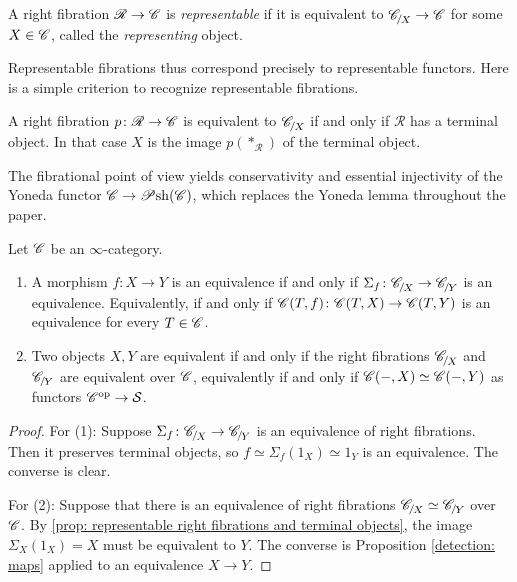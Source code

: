 \documentclass[twoside,a4paper,11pt]{amsart}
\begin{document}
\begin{definition}\label{def: representable fibration}
    A right fibration $\mathscr{R}\to\mathscr{C}$ is \textit{representable} if it is equivalent to $\slice{\C}{X}\to\C$ for some $X\in\mathscr{C}$, called the \textit{representing} object.
\end{definition}
Representable fibrations thus correspond precisely to representable functors. Here is a simple criterion to recognize representable fibrations.
\begin{prop}\label{prop: representable right fibrations and terminal objects}
    A right fibration $p\colon \mathscr{R}\to\mathscr{C}$ is equivalent to $\slice{\C}{X}$ if and only if $\mathscr{R}$ has a terminal object. In that case $X$ is the image $p(\ast_{\mathscr{R}})$ of the terminal object.
\end{prop}
The fibrational point of view yields conservativity and essential injectivity of the Yoneda functor $\mathscr{C}\to\mathscr{P}\mathrm{sh}(\mathscr{C})$, which replaces the Yoneda lemma throughout the paper.
\begin{prop}\label{prop: equivalence is detected on representables}
    Let $\mathscr{C}$ be an $\infty$-category.
    \begin{enumerate}[label=\arabic*., ref=\thetheorem.\arabic*]
        \item\label{detection: maps} A morphism $f\colon X\to Y$ is an equivalence if and only if $\Sigma_f\colon \slice{\C}{X}\to\slice{\C}{Y}$ is an equivalence. Equivalently, if and only if $\mathscr{C}(T,f)\colon\mathscr{C}(T,X)\to\mathscr{C}(T,Y)$ is an equivalence for every $T\in\mathscr{C}$.
        \item\label{detection: objects} Two objects $X,Y$ are equivalent if and only if the right fibrations $\slice{\C}{X}$ and $\slice{\C}{Y}$ are equivalent over $\mathscr{C}$, equivalently if and
        only if $\mathscr{C}(-,X)\simeq\mathscr{C}(-,Y)$ as functors $\mathscr{C}^{\mathrm{op}}\to\mathcal{S}$.
    \end{enumerate}
\end{prop}
\begin{proof}
    For (1): Suppose $\Sigma_f\colon\slice{\C}{X}\to\slice{\C}{Y}$ is an equivalence of right fibrations. Then it preserves terminal objects, so $f\simeq\Sigma_f(1_X)\simeq 1_Y$ is an equivalence. The converse is clear.
    
    For (2): Suppose that there is an equivalence of right fibrations $\slice{\C}{X}\simeq\slice{\C}{Y}$ over $\mathscr{C}$. By \cref{prop: representable right fibrations and terminal objects}, the image $\Sigma_X(1_X)=X$ must be equivalent to $Y$. The converse is Proposition \ref{detection: maps} applied to an equivalence $X\to Y$.
    \end{proof}
\end{document}
